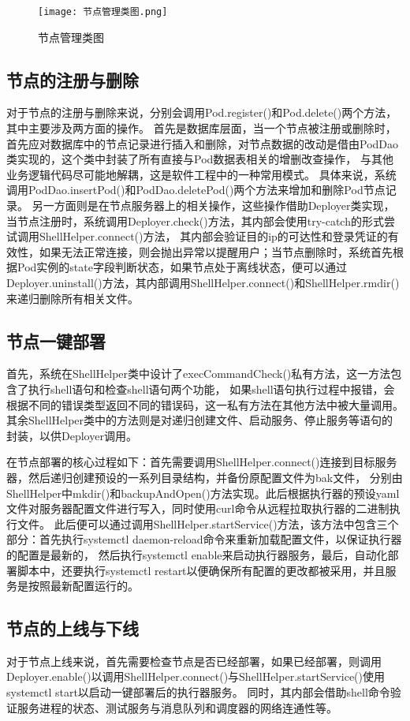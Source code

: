 \begin{figure}[h]
  \centering
  \texttt{[image: 节点管理类图.png]}
  \caption{节点管理类图}
  \label{fig:节点管理类图}
\end{figure}

\subsection{节点的注册与删除}
对于节点的注册与删除来说，分别会调用Pod.register()和Pod.delete()两个方法，其中主要涉及两方面的操作。
首先是数据库层面，当一个节点被注册或删除时，首先应对数据库中的节点记录进行插入和删除，对节点数据的改动是借由PodDao类实现的，这个类中封装了所有直接与Pod数据表相关的增删改查操作，
与其他业务逻辑代码尽可能地解耦，这是软件工程中的一种常用模式。
具体来说，系统调用PodDao.insertPod()和PodDao.deletePod()两个方法来增加和删除Pod节点记录。
另一方面则是在节点服务器上的相关操作，这些操作借助Deployer类实现，当节点注册时，系统调用Deployer.check()方法，其内部会使用try-catch的形式尝试调用ShellHelper.connect()方法，
其内部会验证目的ip的可达性和登录凭证的有效性，如果无法正常连接，则会抛出异常以提醒用户；当节点删除时，系统首先根据Pod实例的state字段判断状态，如果节点处于离线状态，便可以通过
Deployer.uninstall()方法，其内部调用ShellHelper.connect()和ShellHelper.rmdir()来递归删除所有相关文件。

\subsection{节点一键部署}
首先，系统在ShellHelper类中设计了execCommandCheck()私有方法，这一方法包含了执行shell语句和检查shell语句两个功能，
如果shell语句执行过程中报错，会根据不同的错误类型返回不同的错误码，这一私有方法在其他方法中被大量调用。
其余ShellHelper类中的方法则是对递归创建文件、启动服务、停止服务等语句的封装，以供Deployer调用。

在节点部署的核心过程如下：首先需要调用ShellHelper.connect()连接到目标服务器，然后递归创建预设的一系列目录结构，并备份原配置文件为bak文件，
分别由ShellHelper中mkdir()和backupAndOpen()方法实现。此后根据执行器的预设yaml文件对服务器配置文件进行写入，同时使用curl命令从远程拉取执行器的二进制执行文件。
此后便可以通过调用ShellHelper.startService()方法，该方法中包含三个部分：首先执行systemctl daemon-reload命令来重新加载配置文件，以保证执行器的配置是最新的，
然后执行systemctl enable来启动执行器服务，最后，自动化部署脚本中，还要执行systemctl restart以便确保所有配置的更改都被采用，并且服务是按照最新配置运行的。

\subsection{节点的上线与下线}
对于节点上线来说，首先需要检查节点是否已经部署，如果已经部署，则调用Deployer.enable()以调用ShellHelper.connect()与ShellHelper.startService()使用systemctl start以启动一键部署后的执行器服务。
同时，其内部会借助shell命令验证服务进程的状态、测试服务与消息队列和调度器的网络连通性等。

